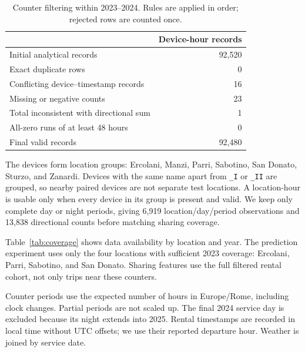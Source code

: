 \documentclass{interact}
\begin{document}
\begin{table}[t]
\caption{Counter filtering within 2023--2024. Rules are applied in order; rejected rows are counted once.}
\label{tab:counter-filter}\centering\footnotesize
\begin{tabular}{lr}
\toprule
 & Device-hour records \\
\midrule
Initial analytical records & 92,520 \\
\midrule
Exact duplicate rows & 0 \\
Conflicting device--timestamp records & 16 \\
Missing or negative counts & 23 \\
Total inconsistent with directional sum & 1 \\
All-zero runs of at least 48 hours & 0 \\
\midrule
Final valid records & 92,480 \\
\bottomrule
\end{tabular}
\end{table}

The \SelectedCounterDevices{} devices form \SelectedCounterSites{} location groups: Ercolani, Manzi, Parri, Sabotino, San Donato, Sturzo, and Zanardi. Devices with the same name apart from \texttt{\_I} or \texttt{\_II} are grouped, so nearby paired devices are not separate test locations. A location-hour is usable only when every device in its group is present and valid. We keep only complete day or night periods, giving 6,919 location/day/period observations and 13,838 directional counts before matching sharing coverage.

Table~\ref{tab:coverage} shows data availability by location and year. The prediction experiment uses only the four locations with sufficient 2023 coverage: Ercolani, Parri, Sabotino, and San Donato. Sharing features use the full filtered rental cohort, not only trips near these counters.

Counter periods use the expected number of hours in Europe/Rome, including clock changes. Partial periods are not scaled up. The final 2024 service day is excluded because its night extends into 2025. Rental timestamps are recorded in local time without UTC offsets; we use their reported departure hour. Weather is joined by service date.

\begin{table}[t]
\caption{Complete day or night periods by location. Zero means no available observation, not zero traffic.}
\label{tab:coverage}\centering\footnotesize

\end{table}
\end{document}
